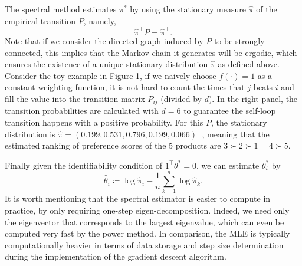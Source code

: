 The spectral method estimates \(\pi^{*}\) by using the stationary measure \(\widehat{\pi}\) of the empirical transition \(P\), namely,
\[
\widehat{\pi}^{\top}P = \widehat{\pi}^{\top}.
\]
Note that if we consider the directed graph induced by \(P\) to be strongly connected, this implies that the Markov chain it generates will be ergodic, which ensures the existence of a unique stationary distribution \(\widehat{\pi}\) as defined above. Consider the toy example in Figure 1, if we naively choose \(f(\cdot) = 1\) as a constant weighting function, it is not hard to count the times that \(j\) beats \(i\) and fill the value into the transition matrix \(P_{i j}\) (divided by \(d\)). In the right panel, the transition probabilities are calculated with \(d = 6\) to guarantee the self-loop transition happens with a positive probability. For this \(P\), the stationary distribution is \(\widehat{\pi} = (0.199,0.531,0.796,0.199,0.066)^{\top}\), meaning that the estimated ranking of preference scores of the 5 products are \(3\succ 2\succ 1 = 4\succ 5\).

Finally given the identifiability condition of \(1^{\top}\theta^{*} = 0\), we can estimate \(\theta_{i}^{*}\) by
\[
\widehat{\theta}_{i}\coloneqq \log \widehat{\pi}_{i} - \frac{1}{n}\sum_{k = 1}^{n}\log \widehat{\pi}_{k}. \tag{2.1}
\]
It is worth mentioning that the spectral estimator is easier to compute in practice, by only requiring one-step eigen-decomposition. Indeed, we need only the eigenvector that corresponds to the largest eigenvalue, which can even be computed very fast by the power method. In comparison, the MLE is typically computationally heavier in terms of data storage and step size determination during the implementation of the gradient descent algorithm.
